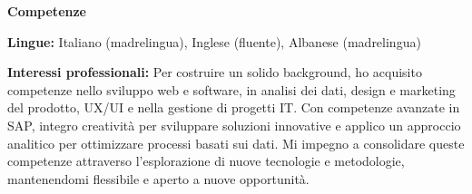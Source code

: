 \documentclass[11pt]{article}
\begin{document}
\vspace{12pt}

\begin{center}
    \textbf{Competenze}
\end{center}
\textbf{Lingue:} Italiano (madrelingua), Inglese (fluente), Albanese (madrelingua)

\textbf{Interessi professionali:} Per costruire un solido background, ho acquisito competenze nello sviluppo web e software, in analisi dei dati, design e marketing del prodotto, UX/UI e nella gestione di progetti IT. Con competenze avanzate in SAP, integro creatività per sviluppare soluzioni innovative e applico un approccio analitico per ottimizzare processi basati sui dati. Mi impegno a consolidare queste competenze attraverso l'esplorazione di nuove tecnologie e metodologie, mantenendomi flessibile e aperto a nuove opportunità.
\end{document}
